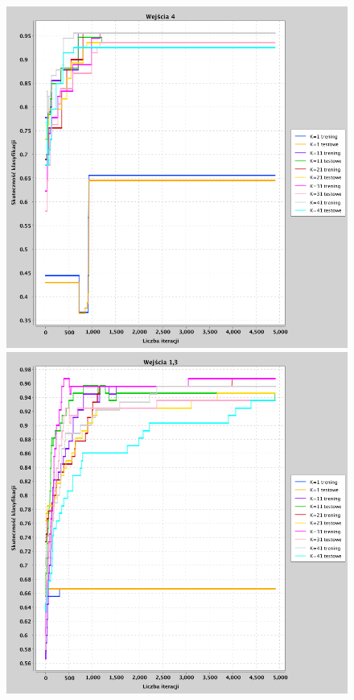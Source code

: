 \documentclass[a4paper, portrait,11pt]{article}
\begin{document}
\begin{figure}[!htb]
  \begin{minipage}{0.33\textwidth}
    \centering
    \includegraphics[width=1\linewidth]{../data/classification4/1/1_4.png}
    \caption{\label{fig:41_1_4}}
  \end{minipage}
  \begin{minipage}{0.33\textwidth}
    \centering
    \includegraphics[width=1\linewidth]{../data/classification4/1/2_1,3.png}

\end{minipage}
\end{figure}
\end{document}
